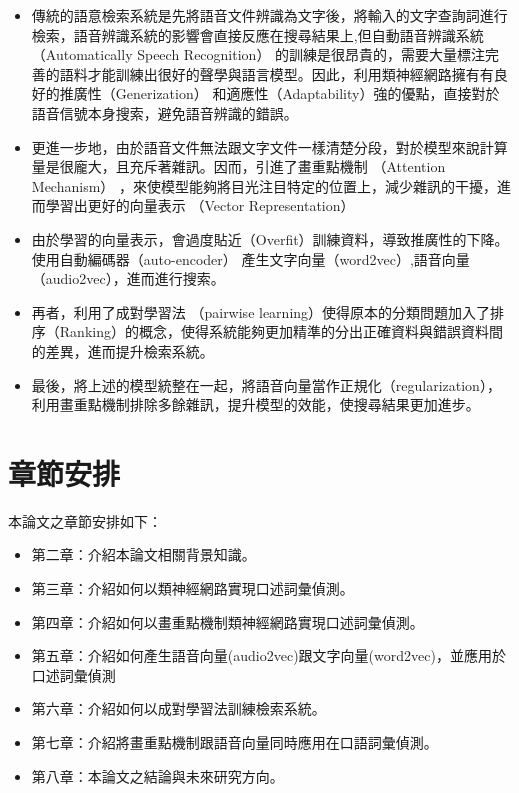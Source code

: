 \begin{itemize}
\itemsep -2pt %
  \item
	  傳統的語意檢索系統是先將語音文件辨識為文字後，將輸入的文字查詢詞進行檢索，語音辨識系統的影響會直接反應在搜尋結果上,但自動語音辨識系統（Automatically Speech Recognition）
的訓練是很昂貴的，需要大量標注完善的語料才能訓練出很好的聲學與語言模型。因此，利用類神經網路擁有有良好的推廣性（Generization）
和適應性（Adaptability）強的優點，直接對於語音信號本身搜索，避免語音辨識的錯誤。
  \item   更進一步地，由於語音文件無法跟文字文件一樣清楚分段，對於模型來說計算量是很龐大，且充斥著雜訊。因而，引進了畫重點機制
	  （Attention Mechanism）
	  ，來使模型能夠將目光注目特定的位置上，減少雜訊的干擾，進而學習出更好的向量表示
	  （Vector Representation）
  \item
	  由於學習的向量表示，會過度貼近（Overfit）訓練資料，導致推廣性的下降。使用自動編碼器（auto-encoder）\cite{vincent2008extracting,li2015hierarchical,baldi2012autoencoders}
	  產生文字向量（word2vec）,語音向量（audio2vec）\cite{mikolov2013distributed,mikolov2013efficient,pennington2014glove,chung2016audio}，進而進行搜索。
  \item   再者，利用了成對學習法 （pairwise
	  learning）使得原本的分類問題加入了排序（Ranking）的概念，使得系統能夠更加精準的分出正確資料與錯誤資料間的差異，進而提升檢索系統。
  \item
	  最後，將上述的模型統整在一起，將語音向量當作正規化（regularization），利用畫重點機制排除多餘雜訊，提升模型的效能，使搜尋結果更加進步。

\end{itemize}

\section{章節安排}
本論文之章節安排如下：

\begin{itemize}
\itemsep -2pt %
  \item  第二章：介紹本論文相關背景知識。
  \item  第三章：介紹如何以類神經網路實現口述詞彙偵測。
  \item  第四章：介紹如何以畫重點機制類神經網路實現口述詞彙偵測。
  \item  第五章：介紹如何產生語音向量(audio2vec)跟文字向量(word2vec)，並應用於口述詞彙偵測
  \item  第六章：介紹如何以成對學習法訓練檢索系統。 
  \item  第七章：介紹將畫重點機制跟語音向量同時應用在口語詞彙偵測。
  \item  第八章：本論文之結論與未來研究方向。
\end{itemize}

